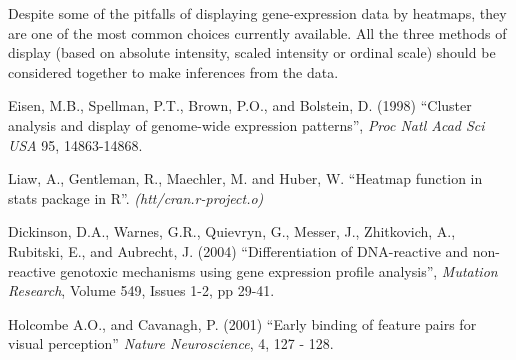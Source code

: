 \documentclass[12pt, oneside, letterpaper]{article}
\begin{document}
	Despite some of the pitfalls of displaying gene-expression
	data by heatmaps, they are one of the most common choices
	currently available. All the three methods of display (based
	on absolute intensity, scaled intensity or ordinal scale)
	should be considered together to make inferences from the
	data.


\begin{thebibliography}{99}

 Eisen, M.B., Spellman, P.T., Brown, P.O., and
Bolstein, D. (1998) ``Cluster analysis and display of genome-wide
expression patterns'', \textit{Proc Natl Acad Sci USA} 95, 14863-14868.

   Liaw, A., Gentleman, R., Maechler, M. and  Huber, W.
``Heatmap function in stats package in R''. \textit{(htt/cran.r-project.o)}

 Dickinson, D.A., Warnes, G.R., Quievryn, G., Messer, J.,
Zhitkovich, A., Rubitski, E., and Aubrecht, J. (2004) ``Differentiation of
DNA-reactive and non-reactive genotoxic mechanisms using gene
expression profile analysis'', \textit{Mutation Research}, Volume 549, Issues
1-2, pp 29-41.


 Holcombe A.O., and Cavanagh, P. (2001) ``Early
binding of feature pairs for visual perception'' \textit{Nature Neuroscience},  4, 127 - 128.




\end{thebibliography}
\end{document}
